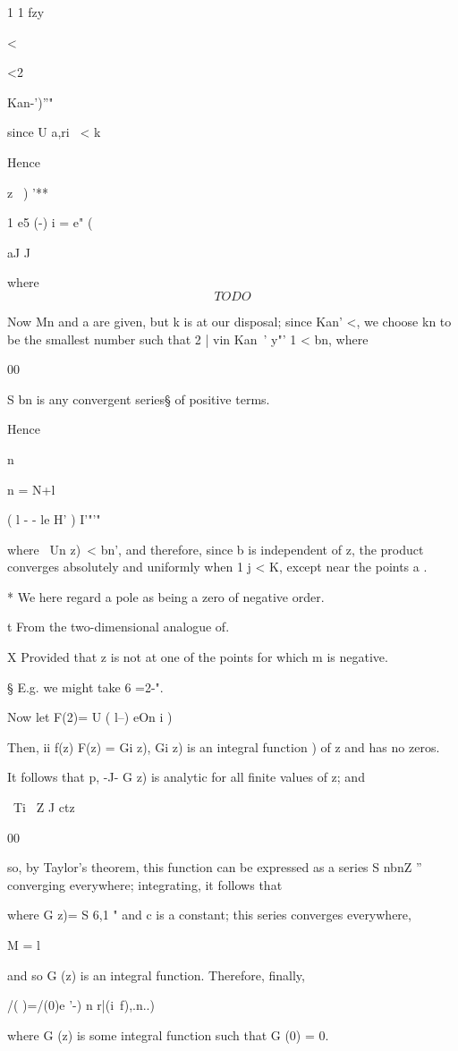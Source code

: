 1 1 fzy

<

<2\ \ {Kan-')''"\,

since U a,ri \ < k

Hence

z \ ) '**

1 e5 (-) i = e" (

aJ J

where
$$
TODO
$$

Now Mn and a are given, but k is at our disposal; since Kan' <, we
choose kn to be the smallest number such that 2 | vin Kan~' y"' 1 <
bn, where

00

S bn is any convergent series§ of positive terms.

Hence

n

n = N+l

 ( l - - le H' ) I'"'"

where \ Un z)\ < bn', and therefore, since b is independent of z, the
product converges absolutely and uniformly when 1 j < K, except near
the points a .

* We here regard a pole as being a zero of negative order.

t From the two-dimensional analogue of.

X Provided that z is not at one of the points for which m is negative.

§ E.g. we might take 6 =2-".
%
%

Now let F(2)= U ( l--) eOn i )

Then, ii f(z) F(z) = Gi z), Gi z) is an integral function ) of
z and has no zeros.

It follows that p, -J- G z) is analytic for all finite values of z;
and

\ Ti \ Z J ctz

00

so, by Taylor's theorem, this function can be expressed as a series S
nbnZ ''~ converging everywhere; integrating, it follows that

where G z)= S 6,1 " and c is a constant; this series converges
everywhere,

M = l

and so G (z) is an integral function. Therefore, finally,

/( )=/(0)e '-) n r|(i\ f),.n..)

where G (z) is some integral function such that G (0) = 0.

}
